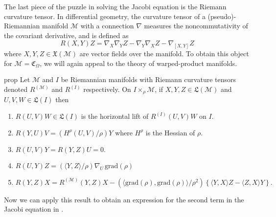\documentclass[11pt]{article}
\newcommand{\man}{\mathcal{M}}
\begin{document}
The last piece of the puzzle in solving the Jacobi equation is the Riemann curvature tensor. In differential geometry, the curvature tensor of a (pseudo)-Riemannian manifold $\man$ with a connection $\nabla$ measures the noncommutativity of the covariant derivative, and is defined as
\begin{equation*}
    R(X,Y)Z = \nabla_X \nabla_YZ - \nabla_Y\nabla_XZ - \nabla_{[X,Y]}Z
\end{equation*}
where $X,Y, Z \in \mathfrak{X}(\man)$ are vector fields over the manifold. To obtain this object for $\man = \mathfrak{C}_\Omega$, we will again appeal to the theory of warped-product manifolds. 
\begin{restatable}{prop}{} \label{prop: warped product curvature tensor}
      Let $\man$ and $I$ be Riemannian manifolds with Riemann curvature tensors denoted $R^{(\man)}$ and $R^{(I)}$ respectively. On $I \times_\rho \man$, if $X, Y, Z \in \mathfrak{L}(\man)$ and $U, V, W \in \mathfrak{L}(I)$ then
    \begin{enumerate}
        \item $R(U, V)W \in \mathfrak{L}(I)$ is the horizontal lift of $R^{(I)}(U,V)W$ on $I$.
        \item $R(Y,U)V = (H^\rho(U,V)/\rho)Y$ where $H^\rho$ is the Hessian of $\rho$.
        \item $R(U,V)Y = R(Y,Z)U = 0.$
        \item $R(U,Y)Z = (\langle Y,Z\rangle/\rho)\nabla_U^{}\,\text{grad}(\rho)$\item $R(Y,Z)X =  R^{(\man)}(Y,Z)X - (\langle \text{grad}(\rho), \text{grad}(\rho)\rangle/\rho^2)\left\{\langle Y,X \rangle  Z - \langle Z, X\rangle Y\right\}.$
    \end{enumerate}
\end{restatable}
Now we can apply this result to obtain an expression for the second term in the Jacobi equation in . 
\end{document}
